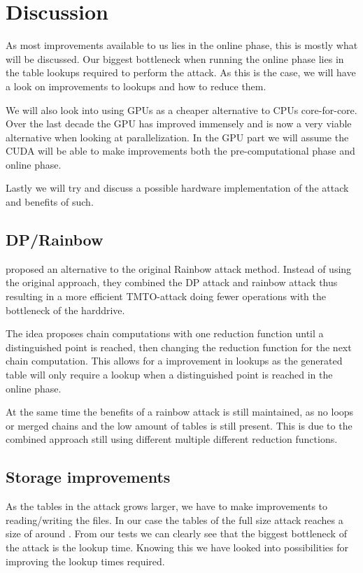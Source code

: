 \chapter{Discussion}
\label{ch:disc}

As most improvements available to us lies in the online phase, this
is mostly what will be discussed. Our biggest bottleneck when running
the online phase lies in the table lookups required to perform the
attack. As this is the case, we will have a look on improvements to
lookups and how to reduce them.

We will also look into using GPUs as a cheaper alternative to CPUs
core-for-core. Over the last decade the GPU has improved immensely and
is now a very viable alternative when looking at parallelization. In
the GPU part we will assume the CUDA will be able to make improvements
both the pre-computational phase and online phase.

Lastly we will try and discuss a possible hardware implementation of the attack
and benefits of such.

\section{DP/Rainbow}

\cite{nohl} proposed an alternative to the original Rainbow attack
method. Instead of using the original approach, they combined the DP
attack and rainbow attack thus resulting in a more efficient
TMTO-attack doing fewer operations with the bottleneck of the
harddrive. 

The idea proposes chain computations with one reduction function
until a distinguished point is reached, then changing the reduction
function for the next chain computation. This allows for a improvement
in lookups as the generated table will only require a lookup when a
distinguished point is reached in the online phase. 

At the same time the benefits of a rainbow attack is still maintained,
as no loops or merged chains and the low amount of tables is still
present. This is due to the combined approach still using different
multiple different reduction functions.

\section{Storage improvements}

As the tables in the attack grows larger, we have to make improvements
to reading/writing the files. In our case the tables of the full size
attack reaches a size of around . From our tests we can
clearly see that the biggest bottleneck of the attack is the lookup
time. Knowing this we have looked into possibilities for improving the
lookup times required.

